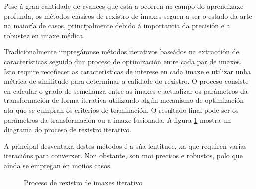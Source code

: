 Pese á gran cantidade de avances que está a ocorren no campo do aprendizaxe profunda, os métodos clásicos de rexistro de imaxes seguen a ser o estado da arte na maioría de casos, 
principalmente debido á importancia da precisión e a robustez en imaxe médica. \cite{}

Tradicionalmente impregáronse métodos iterativos baseádos na extracción de características 
seguido dun proceso de optimización entre cada par de imaxes. 
Isto require recoñecer as características de interese en cada imaxe e utilizar unha métrica de similitude 
para determinar a calidade do rexistro.
O proceso consiste en calcular o grado de semellanza entre as imaxes e 
actualizar os parámetros da transformación de forma iterativa utilizando algún mecanismo de optimización
 ata que se cumpran os criterios de terminación.
O resultado final pode ser os parámetros da transformación ou a imaxe fusionada.
A figura \ref{fig:rexistro_iterativo} mostra un diagrama do proceso de rexistro iterativo.

A principal desventaxa destes métodos é a súa lentitude, xa que requiren varias iteracións para converxer.
Non obstante, son moi precisos e robustos, polo que aínda se empregan en moitos casos.

\begin{figure}[hp!]
    \centering
\caption{Proceso de rexistro de imaxes iterativo}
\label{fig:rexistro_iterativo}
\end{figure}

